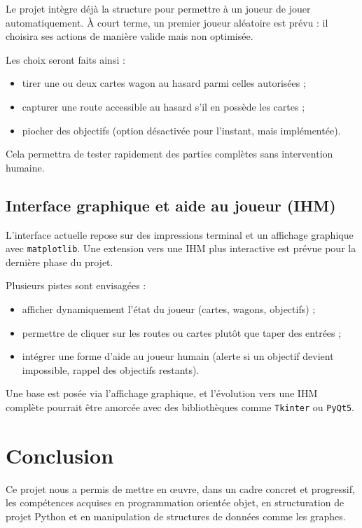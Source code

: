 \documentclass[a4paper,12pt]{report}
\begin{document}
Le projet intègre déjà la structure pour permettre à un joueur de jouer automatiquement. À court terme, un premier joueur aléatoire est prévu : il choisira ses actions de manière valide mais non optimisée.

Les choix seront faits ainsi :
\begin{itemize}
    \item tirer une ou deux cartes wagon au hasard parmi celles autorisées ;
    \item capturer une route accessible au hasard s’il en possède les cartes ;
    \item piocher des objectifs (option désactivée pour l’instant, mais implémentée).
\end{itemize}

Cela permettra de tester rapidement des parties complètes sans intervention humaine.

\section*{Interface graphique et aide au joueur (IHM)}

L’interface actuelle repose sur des impressions terminal et un affichage graphique avec \texttt{matplotlib}. Une extension vers une IHM plus interactive est prévue pour la dernière phase du projet.

Plusieurs pistes sont envisagées :
\begin{itemize}
    \item afficher dynamiquement l’état du joueur (cartes, wagons, objectifs) ;
    \item permettre de cliquer sur les routes ou cartes plutôt que taper des entrées ;
    \item intégrer une forme d’aide au joueur humain (alerte si un objectif devient impossible, rappel des objectifs restants).
\end{itemize}

Une base est posée via l'affichage graphique, et l’évolution vers une IHM complète pourrait être amorcée avec des bibliothèques comme \texttt{Tkinter} ou \texttt{PyQt5}.

\chapter*{Conclusion}

Ce projet nous a permis de mettre en œuvre, dans un cadre concret et progressif, les compétences acquises en
programmation orientée objet, en structuration de projet Python et en manipulation de structures de données comme les
graphes.
\end{document}
